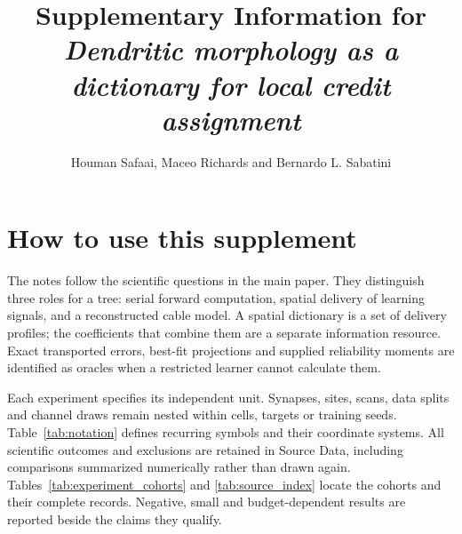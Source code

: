 \documentclass[11pt]{article}
\title{Supplementary Information for\\
\textit{Dendritic morphology as a dictionary for local credit assignment}}
\author{Houman Safaai, Maceo Richards and Bernardo L. Sabatini}
\date{}
\begin{document}
\maketitle
\tableofcontents
\clearpage

\section*{How to use this supplement}

The notes follow the scientific questions in the main paper. They distinguish three roles for a tree: serial forward computation, spatial delivery of learning signals, and a reconstructed cable model. A spatial dictionary is a set of delivery profiles; the coefficients that combine them are a separate information resource. Exact transported errors, best-fit projections and supplied reliability moments are identified as oracles when a restricted learner cannot calculate them.

Each experiment specifies its independent unit. Synapses, sites, scans, data splits and channel draws remain nested within cells, targets or training seeds. Table~\ref{tab:notation} defines recurring symbols and their coordinate systems. All scientific outcomes and exclusions are retained in Source Data, including comparisons summarized numerically rather than drawn again. Tables~\ref{tab:experiment_cohorts} and \ref{tab:source_index} locate the cohorts and their complete records. Negative, small and budget-dependent results are reported beside the claims they qualify.
\end{document}
